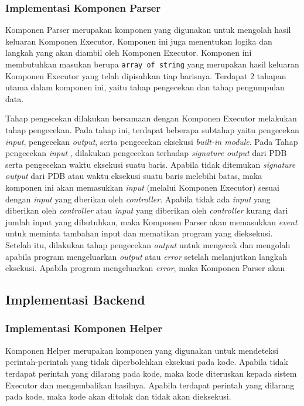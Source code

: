 \subsubsection{Implementasi Komponen Parser}
Komponen Parser merupakan komponen yang digunakan untuk mengolah hasil keluaran Komponen Executor. Komponen ini juga menentukan logika dan langkah yang akan diambil oleh Komponen Executor. Komponen ini membutuhkan masukan berupa \verb|array of string| yang merupakan hasil keluaran Komponen Executor yang telah dipisahkan tiap barisnya. Terdapat 2 tahapan utama dalam komponen ini, yaitu tahap pengecekan dan tahap pengumpulan data.

Tahap pengecekan dilakukan bersamaan dengan Komponen Executor melakukan tahap pengecekan. Pada tahap ini, terdapat beberapa subtahap yaitu pengecekan \textit{input}, pengecekan \textit{output}, serta pengecekan eksekusi \textit{built-in module}. Pada Tahap pengecekan \textit{input}
, dilakukan pengecekan terhadap \textit{signature output} dari PDB serta pengecekan waktu eksekusi suatu baris. Apabila tidak ditemukan \textit{signature output} dari PDB atau waktu eksekusi suatu baris melebihi batas, maka komponen ini akan memasukkan \textit{input} (melalui Komponen Executor) sesuai dengan \textit{input} yang dberikan oleh \textit{controller}. Apabila tidak ada \textit{input} yang diberikan oleh \textit{controller} atau \textit{input} yang diberikan oleh \textit{controller} kurang dari jumlah input yang dibutuhkan, maka Komponen Parser akan memasukkan \textit{event} untuk meminta tambahan input dan mematikan program yang dieksekusi. Setelah itu, dilakukan tahap pengecekan \textit{output} untuk mengecek dan mengolah apabila program mengeluarkan \textit{output} atau \textit{error} setelah melanjutkan langkah eksekusi. Apabila program mengeluarkan \textit{error}, maka Komponen Parser akan

\subsection{Implementasi Backend}
\subsubsection{Implementasi Komponen Helper}
Komponen Helper merupakan komponen yang digunakan untuk mendeteksi perintah-perintah yang tidak diperbolehkan eksekusi pada kode. Apabila tidak terdapat perintah yang dilarang pada kode, maka kode diteruskan kepada sistem Executor dan mengembalikan hasilnya. Apabila terdapat perintah yang dilarang pada kode, maka kode akan ditolak dan tidak akan dieksekusi.


